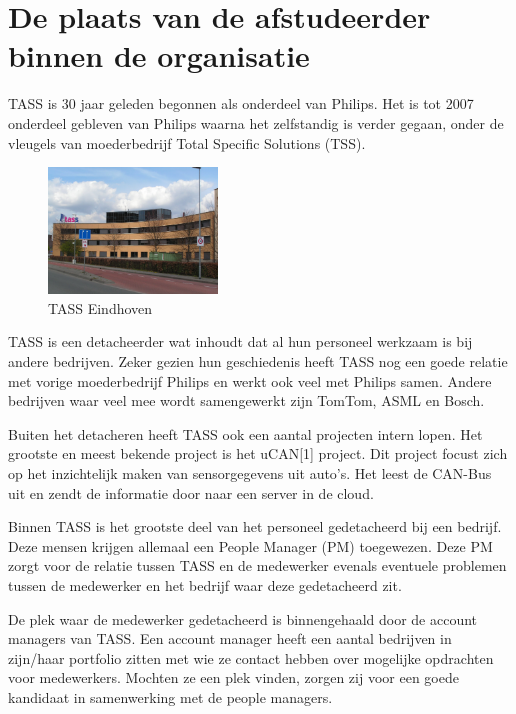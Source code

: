 \documentclass[]{article}
\begin{document}
\newpage
\tableofcontents
\newpage
\listoftables
\listoffigures

\newpage
\section{De plaats van de afstudeerder binnen de organisatie}

TASS is 30 jaar geleden begonnen als onderdeel van Philips. Het is tot 2007
onderdeel gebleven van Philips waarna het zelfstandig is verder gegaan,
onder de vleugels van moederbedrijf Total Specific Solutions (TSS).

\begin{figure}
  \begin{center}
    \includegraphics[width=0.40\textwidth]{tass_eindhoven.pdf}
  \end{center}
  \caption{TASS Eindhoven}
\end{figure}

TASS is een detacheerder wat inhoudt dat al hun personeel werkzaam is bij
andere bedrijven. Zeker gezien hun geschiedenis heeft TASS nog een goede
relatie met vorige moederbedrijf Philips en werkt ook veel met Philips
samen. Andere bedrijven waar veel mee wordt samengewerkt zijn TomTom, ASML
en Bosch.

Buiten het detacheren heeft TASS ook een aantal projecten intern lopen. Het
grootste en meest bekende project is het uCAN[1] project. Dit project
focust zich op het inzichtelijk maken van sensorgegevens uit auto’s. Het
leest de CAN-Bus uit en zendt de informatie door naar een server in de
cloud.

Binnen TASS is het grootste deel van het personeel gedetacheerd bij een
bedrijf. Deze mensen krijgen allemaal een People Manager (PM) toegewezen.
Deze PM zorgt voor de relatie tussen TASS en de medewerker evenals
eventuele problemen tussen de medewerker en het bedrijf waar deze
gedetacheerd zit.

De plek waar de medewerker gedetacheerd is binnengehaald door de account
managers van TASS. Een account manager heeft een aantal bedrijven in
zijn/haar portfolio zitten met wie ze contact hebben over mogelijke
opdrachten voor medewerkers. Mochten ze een plek vinden, zorgen zij voor
een goede kandidaat in samenwerking met de people managers.
\end{document}
